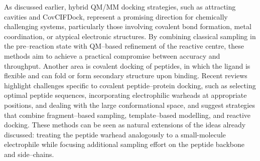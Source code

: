 \documentclass[12pt]{article}
\begin{document}
As discussed earlier, hybrid QM/MM docking strategies, such as attracting cavities\cite{CH14_HybridQMClassDocking2025,CH14_rohrig2023attracting,CH14_chaskar2017fly} and CovCIFDock\cite{CH14_CovCIFDock2025}, represent a promising direction for chemically challenging systems, particularly those involving covalent bond formation, metal coordination, or atypical electronic structures. By combining classical sampling in the pre–reaction state with QM–based refinement of the reactive centre, these methods aim to achieve a practical compromise between accuracy and throughput. Another area is covalent docking of peptides, in which the ligand is flexible and can fold or form secondary structure upon binding.  
Recent reviews highlight challenges specific to covalent peptide–protein docking\cite{CH14_Covpepdock}, such as selecting optimal peptide sequences, incorporating electrophilic warheads at appropriate positions, and dealing with the large conformational space, and suggest strategies that combine fragment–based sampling, template–based modelling, and reactive docking.  These methods can be seen as natural extensions of the ideas already discussed: treating the peptide warhead analogously to a small-molecule electrophile while focusing additional sampling effort on the peptide backbone and side–chains.




\end{document}
